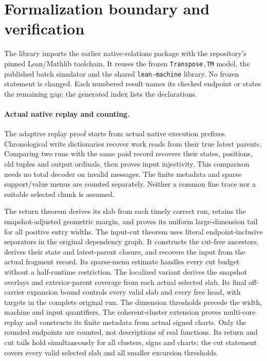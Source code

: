 \section{Formalization boundary and verification}\label{sec:formalization}

The library imports the earlier native-relations package with the repository's
pinned Lean/Mathlib toolchain. It reuses the frozen \texttt{Transpose.TM} model,
the published batch simulator and the shared \texttt{lean-machine} library.
No frozen statement is changed. Each numbered result names its checked
endpoint or states the remaining gap; the generated index lists the declarations.

\paragraph{Actual native replay and counting.}
The adaptive replay proof starts from actual native execution prefixes.
Chronological write dictionaries recover work reads from their true latest
parents. Comparing two runs with the same paid record recovers their states,
positions, old tuples and output ordinals, then proves input injectivity.
This comparison needs no total decoder on invalid messages. The finite
metadata and sparse support/value menus are counted separately. Neither a
common fine trace nor a suitable selected chunk is assumed.

The return theorem derives its slab from each timely correct run, retains
the snapshot-adjusted geometric margin, and proves its uniform large-dimension
tail for all positive entry widths. The input-cut theorem uses literal
endpoint-inclusive separators in the original dependency graph. It constructs
the cut-free ancestors, derives their state and latest-parent closure, and
recovers the input from the actual fragment record. Its sparse-menu estimate
handles every cut budget without a half-runtime restriction. The localized
variant derives the snapshot overlays and exterior-parent coverage from each
actual selected slab. Its final off-carrier expansion bound controls every
valid slab and every free head, with targets in the complete original run.
The dimension thresholds precede the width, machine and input quantifiers.
The coherent-cluster extension proves multi-core replay and constructs its
finite metadata from actual signed charts. Only the rounded endpoints are
counted, not descriptions of real functions. Its return and cut tails hold
simultaneously for all clusters, signs and charts; the cut statement covers
every valid selected slab and all smaller excursion thresholds.

